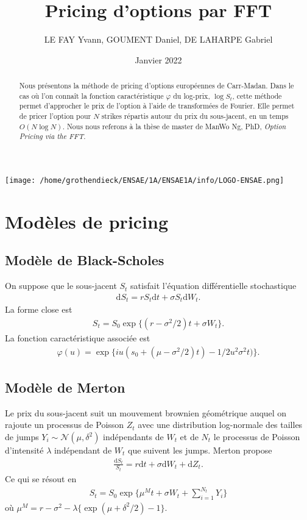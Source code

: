 \documentclass{article}
\begin{document}
\title{Pricing d'options par FFT}
\author{LE FAY Yvann, GOUMENT Daniel, DE LAHARPE Gabriel}
\date{Janvier 2022}
\maketitle
\begin{center}
	\texttt{[image: /home/grothendieck/ENSAE/1A/ENSAE1A/info/LOGO-ENSAE.png]}
\end{center}
\begin{abstract}
	Nous présentons la méthode de pricing d'options européennes de Carr-Madan. Dans le cas où l'on connaît la fonction caractéristique $\varphi$ du log-prix, $\log S_t$, cette méthode  permet d'approcher le prix de l'option à l'aide de transformées de Fourier. Elle permet de pricer l'option pour $N$ strikes répartis autour du prix du sous-jacent, en un temps $O(N\log N)$.
	Nous nous referons à la thèse de master de ManWo Ng, PhD, \textit{Option Pricing via the FFT}.
\end{abstract}

\section{Modèles de pricing}
\subsection{Modèle de Black-Scholes}

On suppose que le sous-jacent $S_t$ satisfait l'équation différentielle stochastique
%
\begin{align*}
	\mathrm{d}S_t = rS_t\mathrm{d}t + \sigma S_t \mathrm{d}W_t.
\end{align*}
%
La forme close est
%
\begin{align*}
	S_t = S_0\exp\big\{(r-\sigma^2/2)t+\sigma W_t\big\}.
\end{align*}
%
La fonction caractéristique associée est
%
\begin{align*}
	\varphi(u) = \exp\big\{iu(s_0+(\mu-\sigma^2/2)t)-1/2u^2\sigma^2t)\big\}.
\end{align*}
%
\subsection{Modèle de Merton}
Le prix du sous-jacent suit un mouvement brownien géométrique auquel on rajoute un processus de Poisson $Z_t$ avec une distribution log-normale des tailles de jumps $Y_i\sim \mathcal{N}(\mu, \delta^2)$ indépendants de $W_t$ et de $N_t$ le processus de Poisson d'intensité $\lambda$ indépendant de $W_t$ que suivent les jumps. Merton propose
%
\begin{align*}
	\frac{\mathrm{d}S_t}{S_t} = r\mathrm{d}t + \sigma\mathrm{d}W_t + \mathrm{d}Z_t.
\end{align*}
%
Ce qui se résout en
%
\begin{align*}
	S_t = S_0 \exp\big\{\mu^M t +  \sigma W_t + \sum_{i=1}^{N_t} Y_i\big\}
\end{align*}
%
où $\mu^M = r - \sigma^2-\lambda\{\exp(\mu+\delta^2/2)-1\}$. 
\end{document}
